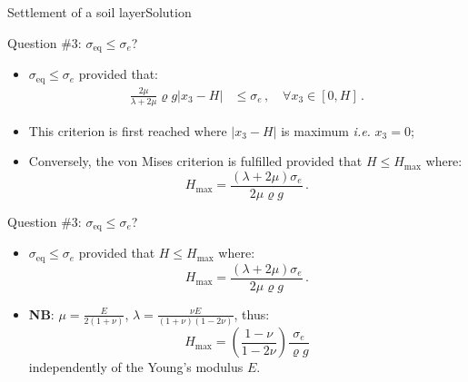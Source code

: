 \documentclass{beamer}
\newcommand{\xj}{x}
\newcommand{\roi}{\varrho}
\newcommand*{\stressj}{\sigma}
\newcommand{\abs}[1]{\left|#1\right|}
\begin{document}
\begin{frame}{Settlement of a soil layer}{Solution}
\begin{overprint}
\vskip-20pt
\begin{exampleblock}{Question \#3: $\stressj_\text{eq}\leq\stressj_e$?}
\begin{itemize}
\item $\stressj_\text{eq} \leq \stressj_e$ provided that:
\begin{displaymath}
\begin{split}
\frac{2\mu}{\lambda+2\mu}\roi g \abs{\xj_3-H} &\leq \stressj_e\,,\quad\forall\xj_3\in[0,H]\,.
\end{split}
\end{displaymath}
\item This criterion is first reached where $\abs{\xj_3-H}$ is maximum \emph{i.e.} $\xj_3=0$;
\item Conversely, the von Mises criterion is fulfilled provided that $H\leq H_\text{max}$ where:
\begin{displaymath}
\boxed{H_\text{max}=\frac{(\lambda+2\mu)\stressj_e}{2\mu \roi g}}\,.
\end{displaymath}
\end{itemize}
\end{exampleblock}

\vskip-20pt
\begin{exampleblock}{Question \#3: $\stressj_\text{eq}\leq\stressj_e$?}
\begin{itemize}
\item $\stressj_\text{eq} \leq \stressj_e$ provided that $H\leq H_\text{max}$ where:
\begin{displaymath}
H_\text{max}=\frac{(\lambda+2\mu)\stressj_e}{2\mu \roi g}\,.
\end{displaymath}
\item {\bf NB}: $\mu=\frac{E}{2(1+\nu)}$, $\lambda=\frac{\nu E}{(1+\nu)(1-2\nu)}$, thus:
\begin{displaymath}
H_\text{max}=\left(\frac{1-\nu}{1-2\nu}\right)\frac{\stressj_e}{\roi g}
\end{displaymath}
independently of the Young's modulus $E$.
\end{itemize}
\end{exampleblock}

\end{overprint}

\end{frame}
\end{document}
